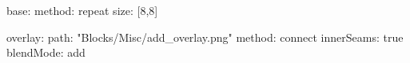 base:
  method: repeat
  size: [8,8]

overlay:
  path: "Blocks/Misc/add_overlay.png"
  method: connect
  innerSeams: true
  blendMode: add
